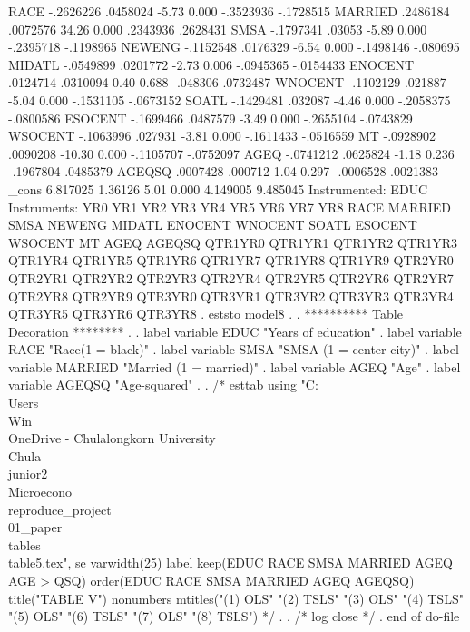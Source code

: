         RACE {\VBAR}  -.2626226   .0458024    -5.73   0.000    -.3523936   -.1728515
     MARRIED {\VBAR}   .2486184   .0072576    34.26   0.000     .2343936    .2628431
        SMSA {\VBAR}  -.1797341     .03053    -5.89   0.000    -.2395718   -.1198965
      NEWENG {\VBAR}  -.1152548   .0176329    -6.54   0.000    -.1498146    -.080695
      MIDATL {\VBAR}  -.0549899   .0201772    -2.73   0.006    -.0945365   -.0154433
     ENOCENT {\VBAR}   .0124714   .0310094     0.40   0.688     -.048306    .0732487
     WNOCENT {\VBAR}  -.1102129    .021887    -5.04   0.000    -.1531105   -.0673152
       SOATL {\VBAR}  -.1429481    .032087    -4.46   0.000    -.2058375   -.0800586
     ESOCENT {\VBAR}  -.1699466   .0487579    -3.49   0.000    -.2655104   -.0743829
     WSOCENT {\VBAR}  -.1063996    .027931    -3.81   0.000    -.1611433   -.0516559
          MT {\VBAR}  -.0928902   .0090208   -10.30   0.000    -.1105707   -.0752097
        AGEQ {\VBAR}  -.0741212   .0625824    -1.18   0.236    -.1967804    .0485379
      AGEQSQ {\VBAR}   .0007428    .000712     1.04   0.297    -.0006528    .0021383
       _cons {\VBAR}   6.817025    1.36126     5.01   0.000     4.149005    9.485045
Instrumented:  EDUC
Instruments:   YR0 YR1 YR2 YR3 YR4 YR5 YR6 YR7 YR8 RACE MARRIED SMSA NEWENG
               MIDATL ENOCENT WNOCENT SOATL ESOCENT WSOCENT MT AGEQ AGEQSQ
               QTR1YR0 QTR1YR1 QTR1YR2 QTR1YR3 QTR1YR4 QTR1YR5 QTR1YR6
               QTR1YR7 QTR1YR8 QTR1YR9 QTR2YR0 QTR2YR1 QTR2YR2 QTR2YR3
               QTR2YR4 QTR2YR5 QTR2YR6 QTR2YR7 QTR2YR8 QTR2YR9 QTR3YR0
               QTR3YR1 QTR3YR2 QTR3YR3 QTR3YR4 QTR3YR5 QTR3YR6 QTR3YR8
{\smallskip}
. eststo model8
{\smallskip}
. 
. **********  Table Decoration ********
. 
. label variable EDUC   "Years of education"
{\smallskip}
. label variable RACE   "Race(1 = black)"
{\smallskip}
. label variable SMSA   "SMSA (1 = center city)"
{\smallskip}
. label variable MARRIED   "Married (1 = married)"
{\smallskip}
. label variable AGEQ   "Age"
{\smallskip}
. label variable AGEQSQ   "Age-squared"
{\smallskip}
. 
. /* esttab using "C:\\Users\\Win\\OneDrive - Chulalongkorn University\\Chula\\junior2\\Microecono\\reproduce_project\\01_paper\\tables\\table5.tex", se varwidth(25) label keep(EDUC RACE SMSA MARRIED AGEQ AGE
> QSQ) order(EDUC RACE SMSA MARRIED AGEQ AGEQSQ) title("TABLE V") nonumbers mtitles("(1) OLS" "(2) TSLS" "(3) OLS" "(4) TSLS" "(5) OLS" "(6) TSLS" "(7) OLS" "(8) TSLS") */
. 
. /* log close */
. 
end of do-file
{\smallskip}
